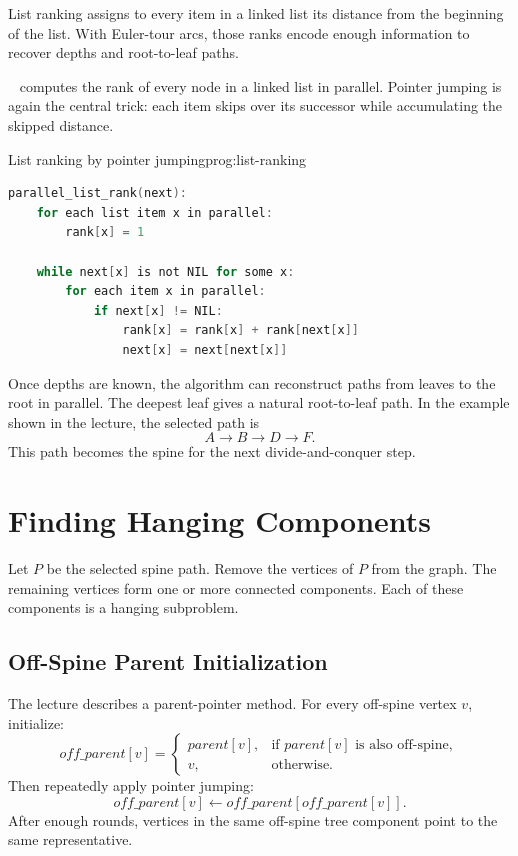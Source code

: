 List ranking assigns to every item in a linked list its distance from the beginning of the list.
With Euler-tour arcs, those ranks encode enough information to recover depths and root-to-leaf paths.

\begin{ppdefn}
\  computes the rank of every node in a linked list in parallel.
Pointer jumping is again the central trick: each item skips over its successor while accumulating the skipped distance.
\end{ppdefn}

\begin{ppprogram}{List ranking by pointer jumping}{prog:list-ranking}
\begin{lstlisting}[language=C]
parallel_list_rank(next):
    for each list item x in parallel:
        rank[x] = 1

    while next[x] is not NIL for some x:
        for each item x in parallel:
            if next[x] != NIL:
                rank[x] = rank[x] + rank[next[x]]
                next[x] = next[next[x]]
\end{lstlisting}
\end{ppprogram}

Once depths are known, the algorithm can reconstruct paths from leaves to the root in parallel.
The deepest leaf gives a natural root-to-leaf path.
In the example shown in the lecture, the selected path is
\[
    A \to B \to D \to F.
\]
This path becomes the spine for the next divide-and-conquer step.

\section{Finding Hanging Components}
\label{sec:hanging-components}

Let \(P\) be the selected spine path.
Remove the vertices of \(P\) from the graph.
The remaining vertices form one or more connected components.
Each of these components is a hanging subproblem.

\subsection{Off-Spine Parent Initialization}

The lecture describes a parent-pointer method.
For every off-spine vertex \(v\), initialize:
\[
off\_parent[v] =
\begin{cases}
parent[v], & \text{if } parent[v] \text{ is also off-spine},\\
v,         & \text{otherwise}.
\end{cases}
\]
Then repeatedly apply pointer jumping:
\[
    off\_parent[v] \gets off\_parent[off\_parent[v]].
\]
After enough rounds, vertices in the same off-spine tree component point to the same representative.

